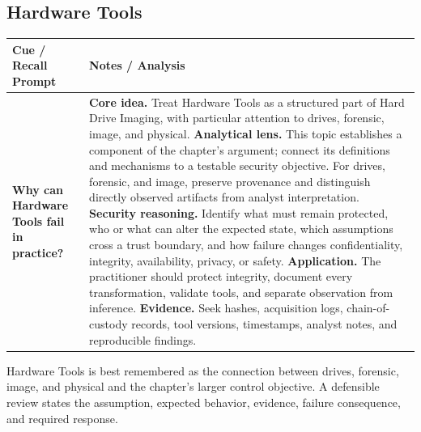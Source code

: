 \documentclass[11pt]{article}
\newcommand{\CornellHeader}{%
\rowcolor{Navy}\color{white}\bfseries Cue / Recall Prompt & \color{white}\bfseries Notes / Analysis\\\hline}
\newcommand{\CornellRow}[2]{%
\cellcolor{CueGray}\RaggedRight\textbf{#1} & \RaggedRight #2\\\hline}
\begin{document}
\subsection*{Hardware Tools}
\begin{longtable}{>{\RaggedRight\arraybackslash}p{}|>{\RaggedRight\arraybackslash}p{}}
\CornellHeader
\CornellRow{Why can Hardware Tools fail in practice?}{\textbf{Core idea.} Treat Hardware Tools as a structured part of Hard Drive Imaging, with particular attention to drives, forensic, image, and physical. \textbf{Analytical lens.} This topic establishes a component of the chapter's argument; connect its definitions and mechanisms to a testable security objective. For drives, forensic, and image, preserve provenance and distinguish directly observed artifacts from analyst interpretation. \textbf{Security reasoning.} Identify what must remain protected, who or what can alter the expected state, which assumptions cross a trust boundary, and how failure changes confidentiality, integrity, availability, privacy, or safety. \textbf{Application.} The practitioner should protect integrity, document every transformation, validate tools, and separate observation from inference. \textbf{Evidence.} Seek hashes, acquisition logs, chain-of-custody records, tool versions, timestamps, analyst notes, and reproducible findings.}
\end{longtable}
\begin{topicsummary}
Hardware Tools is best remembered as the connection between drives, forensic, image, and physical and the chapter's larger control objective. A defensible review states the assumption, expected behavior, evidence, failure consequence, and required response.
\end{topicsummary}
\end{document}
